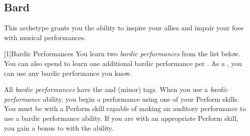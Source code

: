     \subsection{Bard}
        This archetype grants you the ability to inspire your allies and impair your foes with musical performances.

        [1]{Bardic Performances}
        You learn two \textit{bardic performances} from the list below.
        You can also spend  to learn one additional bardic performance per .
        As a , you can use any bardic performance you know.

        All \textit{bardic performances} have the  and  (minor) tags.
        When you use a \textit{bardic performance} ability, you begin a performance using one of your Perform skills.
        You must be  with a Perform skill capable of making an auditory performance to use a bardic performance ability.
        If you are  with an appropriate Perform skill, you gain a  bonus to  with the ability.

